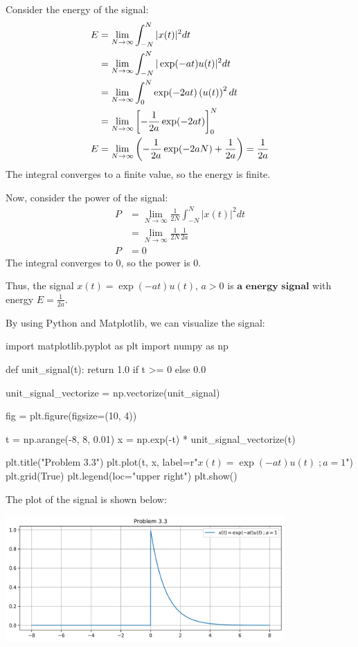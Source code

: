 \documentclass[a4paper, 10pt]{article}
\begin{document}
\begin{solution}
Consider the energy of the signal:
\begin{align*}
    E &= \lim_{N \to \infty} \int_{-N}^{N} |x(t)|^2 dt \\
    &= \lim_{N \to \infty} \int_{-N}^{N} |\exp(-at)u(t)|^2 dt \\
    &= \lim_{N \to \infty} \int_{0}^{N} \exp(-2at) \left(u(t)\right)^2 dt \\
    &= \lim_{N \to \infty} \left[ -\frac{1}{2a} \exp(-2at) \right]_{0}^{N} \\
    E &= \lim_{N \to \infty} \left( -\frac{1}{2a} \exp(-2aN) + \frac{1}{2a} \right) = \frac{1}{2a}
\end{align*}
The integral converges to a finite value, so the energy is finite.

\vspace{5mm}

Now, consider the power of the signal:
\begin{align*}
    P &= \lim_{N \to \infty} \frac{1}{2N} \int_{-N}^{N} |x(t)|^2 dt \\
    &= \lim_{N \to \infty} \frac{1}{2N} \frac{1}{2a} \\
    P &= 0
\end{align*}
The integral converges to 0, so the power is 0.

\vspace{2mm}

Thus, the signal \( x(t) = \exp(-at)u(t), \,  a > 0 \) is \( \boxed{\textbf{a energy signal}} \) with energy \( \boxed{E = \frac{1}{2a}} \).

\vspace{2mm}

By using Python and Matplotlib, we can visualize the signal:
\begin{codingbox}
import matplotlib.pyplot as plt
import numpy as np

def unit_signal(t):
    return 1.0 if t >= 0 else 0.0

unit_signal_vectorize = np.vectorize(unit_signal)

fig = plt.figure(figsize=(10, 4))

t = np.arange(-8, 8, 0.01)
x = np.exp(-t) * unit_signal_vectorize(t)

plt.title("Problem 3.3")
plt.plot(t, x, label=r"$x(t) = \exp(-at)u(t) \;; a = 1$")
plt.grid(True)
plt.legend(loc="upper right")
plt.show()
\end{codingbox}

\newpage

The plot of the signal is shown below:
\begin{center}
    \includegraphics[width=0.8\textwidth]{images/problem_3_3.png}
\end{center}
\end{solution}
\end{document}
